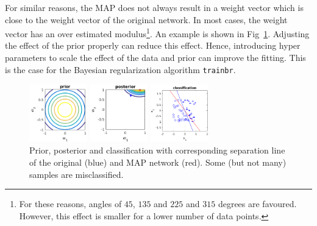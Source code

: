 \documentclass[10pt,a4paper]{article}
\begin{document}
For similar reasons, the MAP does not always result in a weight vector which is close to the weight vector of the original network. In most cases, the weight vector has an over estimated modulus\footnote{For these reasons, angles of $45$, $135$ and $225$ and $315$ degrees are favoured. However, this effect is smaller for a lower number of data points.}. An example is shown in Fig~\ref{fig:example_perbayes}. Adjusting the effect of the prior properly can reduce this effect. Hence, introducing hyper parameters to scale the effect of the data and prior can improve the fitting. This is the case for the Bayesian regularization algorithm \texttt{trainbr}.
\begin{figure}[htb]
\centering
\begin{minipage}{0.2\textwidth}
\includegraphics[height=2.5cm]{figs/prior_contour.png}
\end{minipage}%
\begin{minipage}{0.2\textwidth}
\includegraphics[height=2.5cm]{figs/posterior_contour.png}
\end{minipage}%
\begin{minipage}{0.2\textwidth}
\includegraphics[height=2.5cm]{figs/separation_line.png}
\end{minipage}%
\caption{Prior, posterior and classification with corresponding separation line of the original (blue) and MAP network (red). Some (but not many) samples are misclassified.\label{fig:example_perbayes}}
\end{figure}
\end{document}
